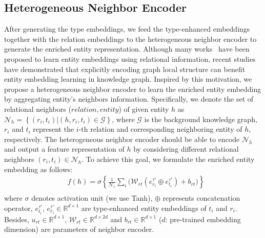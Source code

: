 \subsection{Heterogeneous Neighbor Encoder}
\label{neighbor_encoder}
After generating the type embeddings, we feed the type-enhanced embeddings together with the relation embeddings to the heterogeneous neighbor encoder to generate the enriched entity representation. Although many works~\cite{bordes2013translating,yang2015embedding} have been proposed to learn entity embeddings using relational information, recent studies~\cite{xiong2018one,zhang2019few} have demonstrated that explicitly encoding graph local structure can benefit entity embedding learning in knowledge graph. Inspired by this motivation, we propose a heterogeneous neighbor encoder to learn the enriched entity embedding by aggregating entity's neighbors information. Specifically, we denote the set of relational neighbors ($relation, entity$) of given entity $h$ as $\mathcal{N}_{h} = \left \{ (r_{i}, t_{i}) | (h, r_{i}, t_{i})\in \mathcal{G}\right \}$, where $\mathcal{G}$ is the background knowledge graph, $r_{i}$ and $t_{i}$ represent the $i$-th relation and corresponding neighboring entity of $h$, respectively. The heterogeneous neighbor encoder should be able to encode $\mathcal{N}_{h}$ and output a feature representation of $h$ by considering different relational neighbors $(r_{i}, t_{i}) \in \mathcal{N}_{h}$. To achieve this goal, we formulate the enriched entity embedding as follows:
\begin{equation}\label{eq:neighbor_encoder}
\begin{aligned}
& f(h) = \sigma \left \{ \frac{1}{\mathcal{N}_{e}}\sum _{i} \left. \big(\mathcal{W}_{rt}(e_{r_{i}}^{\tau'}\oplus e_{t_{i}}^{\tau'}) + b_{rt}\right. \big) \right \}\\ 
\end{aligned}
\end{equation}
where $\sigma$ denotes activation unit (we use Tanh), $\oplus$ represents concatenation operator, $e_{t_{i}}^{\tau'}$, $e_{r_{i}}^{\tau'} \in \mathbb{R}^{d \times 1}$ are type-enhanced entity embeddings of $t_{i}$ and $r_{i}$. Besides, $u_{rt} \in \mathbb{R}^{d \times 1}$, $\mathcal{W}_{rt} \in \mathbb{R}^{d \times 2d}$ and $b_{rt} \in \mathbb{R}^{d \times 1}$ ($d$: pre-trained embedding dimension) are  parameters of neighbor encoder. 



